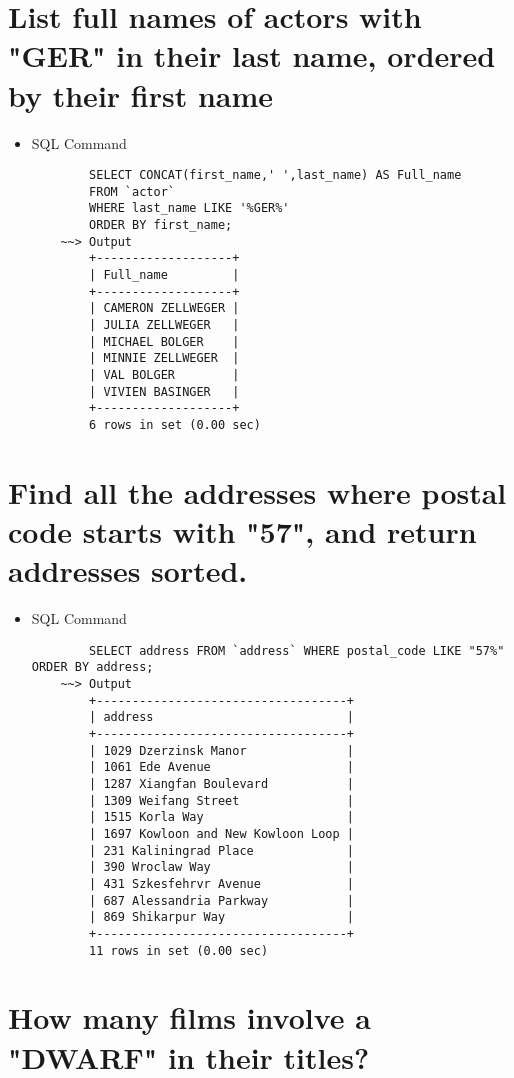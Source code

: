 \documentclass[13pt,a4paper]{report}
\begin{document}
\section{ List full names of actors with "GER" in their last name, ordered by their first name }

\begin{itemize}
	\item SQL Command
	\begin{lstlisting}
		SELECT CONCAT(first_name,' ',last_name) AS Full_name 
		FROM `actor`
		WHERE last_name LIKE '%GER%' 
		ORDER BY first_name;
	~~> Output
		+-------------------+
		| Full_name         |
		+-------------------+
		| CAMERON ZELLWEGER |
		| JULIA ZELLWEGER   |
		| MICHAEL BOLGER    |
		| MINNIE ZELLWEGER  |
		| VAL BOLGER        |
		| VIVIEN BASINGER   |
		+-------------------+
		6 rows in set (0.00 sec)

	\end{lstlisting}
\end{itemize}

\section{ Find all the addresses where postal code starts with "57", and return addresses sorted. }

\begin{itemize}
	\item SQL Command
	\begin{lstlisting}
		SELECT address FROM `address` WHERE postal_code LIKE "57%" ORDER BY address;
	~~> Output
		+-----------------------------------+
		| address                           |
		+-----------------------------------+
		| 1029 Dzerzinsk Manor              |
		| 1061 Ede Avenue                   |
		| 1287 Xiangfan Boulevard           |
		| 1309 Weifang Street               |
		| 1515 Korla Way                    |
		| 1697 Kowloon and New Kowloon Loop |
		| 231 Kaliningrad Place             |
		| 390 Wroclaw Way                   |
		| 431 Szkesfehrvr Avenue            |
		| 687 Alessandria Parkway           |
		| 869 Shikarpur Way                 |
		+-----------------------------------+
		11 rows in set (0.00 sec)

\end{lstlisting}

\end{itemize}

\section{ How many films involve a "DWARF" in their titles? }
\end{document}
